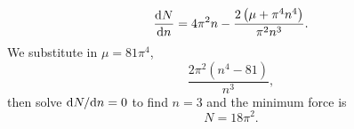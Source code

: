 \documentclass[a4paper, 12pt]{article}
\begin{document}
\begin{enumerate}[label={\bf \arabic{*}.\;}, ref={\arabic{*}},itemsep=3ex, left=0ex]
{\begin{enumerate}[label=(\alph*)]
{            \begin{equation}
              \fd{N}{n} =4 \pi ^2 n-\frac{2 \left(\mu +\pi ^4 n^4\right)}{\pi ^2 n^3}.
            \end{equation}
            We substitute in $\mu = 81\pi^4$,
            \begin{equation}
              \frac{2 \pi ^2 \left(n^4-81\right)}{n^3},
            \end{equation}
            then solve $\fd{N}{n}=0$ to find $n=3$ and the minimum force is
            \begin{equation}
              N = 18 \pi^2.
            \end{equation}
          }
      \end{enumerate}

    }

\end{enumerate}
\end{document}
